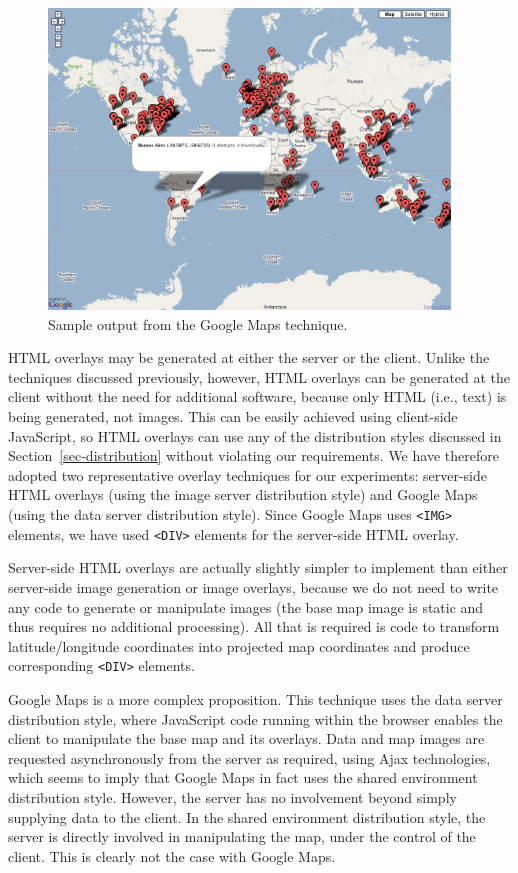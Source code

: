 \documentclass[acmtocl,acmnow]{acmtrans2m}
\begin{document}
\begin{figure}
	\centering
	\includegraphics[width=0.95\textwidth,keepaspectratio]{GoogleMap-full.png}
	\caption{Sample output from the Google Maps technique.}
	\label{fig-google}
\end{figure}


HTML overlays may be generated at either the server or the client.
Unlike the techniques discussed previously, however, HTML overlays can
be generated at the client without the need for additional software,
because only HTML (i.e., text) is being generated, not images. This can
be easily achieved using client-side JavaScript, so HTML overlays can
use any of the distribution styles discussed in
Section~\ref{sec-distribution} without violating our requirements. We
have therefore adopted two representative overlay techniques for our
experiments: server-side HTML overlays (using the image server
distribution style) and Google Maps (using the data server distribution
style). Since Google Maps uses \verb|<IMG>| elements, we have used
\verb|<DIV>| elements for the server-side HTML overlay.

Server-side HTML overlays are actually slightly simpler to implement
than either server-side image generation or image overlays, because we
do not need to write any code to generate or manipulate images (the base
map image is static and thus requires no additional processing). All
that is required is code to transform latitude/longitude coordinates
into projected map coordinates and produce corresponding \verb|<DIV>|
elements.

Google Maps \cite{Goog-M-2006-maps} is a more complex proposition. This
technique uses the data server distribution style, where JavaScript code
running within the browser enables the client to manipulate the base map
and its overlays. Data and map images are requested asynchronously from
the server as required, using Ajax technologies, which seems to imply
that Google Maps in fact uses the shared environment distribution style.
However, the server has no involvement beyond simply supplying data to
the client. In the shared environment distribution style, the server is
directly involved in manipulating the map, under the control of the
client. This is clearly not the case with Google Maps.
\end{document}

